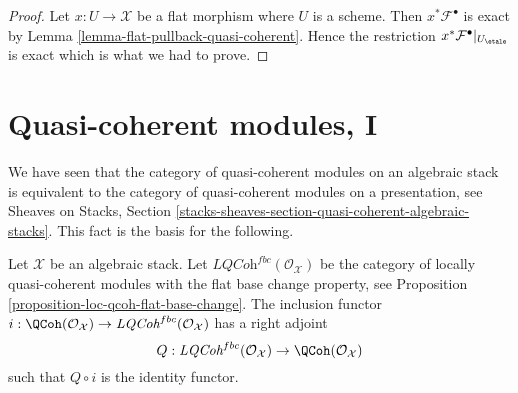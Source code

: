 \begin{proof}
Let $x : U \to \mathcal{X}$ be a flat morphism where $U$ is a scheme.
Then $x^*\mathcal{F}^\bullet$ is exact by
Lemma \ref{lemma-flat-pullback-quasi-coherent}.
Hence the restriction $x^*\mathcal{F}^\bullet|_{U_\etale}$
is exact which is what we had to prove.
\end{proof}





\section{Quasi-coherent modules, I}
\label{section-quasi-coherent}

\noindent
We have seen that the category of quasi-coherent modules on an algebraic
stack is equivalent to the category of quasi-coherent modules on a
presentation, see
Sheaves on Stacks, Section
\ref{stacks-sheaves-section-quasi-coherent-algebraic-stacks}.
This fact is the basis for the following.

\begin{lemma}
\label{lemma-adjoint}
Let $\mathcal{X}$ be an algebraic stack. Let
$\textit{LQCoh}^{fbc}(\mathcal{O}_\mathcal{X})$
be the category of locally quasi-coherent modules with the
flat base change property, see
Proposition \ref{proposition-loc-qcoh-flat-base-change}.
The inclusion functor
$i : \QCoh(\mathcal{O}_\mathcal{X}) \to
\textit{LQCoh}^{fbc}(\mathcal{O}_\mathcal{X})$
has a right adjoint
$$
Q : \textit{LQCoh}^{fbc}(\mathcal{O}_\mathcal{X}) \to
\QCoh(\mathcal{O}_\mathcal{X})
$$
such that $Q \circ i$ is the identity functor.
\end{lemma}

